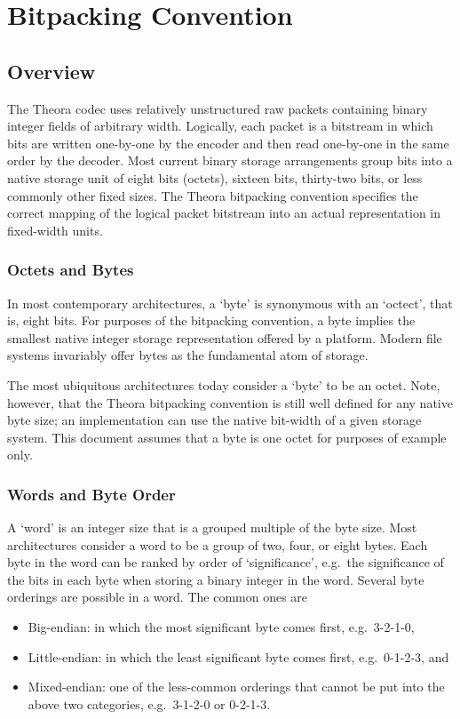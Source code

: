 \documentclass[11pt,letterpaper]{book}
\numberwithin{equation}{chapter}
\numberwithin{figure}{chapter}
\numberwithin{table}{chapter}
\begin{document}

\chapter{Bitpacking Convention}
\label{sec:bitpacking}

\section{Overview}

The Theora codec uses relatively unstructured raw packets containing
 binary integer fields of arbitrary width.
Logically, each packet is a bitstream in which bits are written one-by-one by
 the encoder and then read one-by-one in the same order by the decoder.
Most current binary storage arrangements group bits into a native storage unit
 of eight bits (octets), sixteen bits, thirty-two bits, or less commonly other
 fixed sizes.
The Theora bitpacking convention specifies the correct mapping of the logical
 packet bitstream into an actual representation in fixed-width units.

\subsection{Octets and Bytes}

In most contemporary architectures, a `byte' is synonymous with an `octect',
 that is, eight bits.
For purposes of the bitpacking convention, a byte implies the smallest native
 integer storage representation offered by a platform.
Modern file systems invariably offer bytes as the fundamental atom of storage.

The most ubiquitous architectures today consider a `byte' to be an octet.
Note, however, that the Theora bitpacking convention is still well defined for
 any native byte size; an implementation can use the native bit-width of a
 given storage system.
This document assumes that a byte is one octet for purposes of example only.

\subsection{Words and Byte Order}

A `word' is an integer size that is a grouped multiple of the byte size.
Most architectures consider a word to be a group of two, four, or eight bytes.
Each byte in the word can be ranked by order of `significance', e.g.\ the
 significance of the bits in each byte when storing a binary integer in the
 word.
Several byte orderings are possible in a word.
The common ones are
\begin{itemize}
\item{Big-endian:}
in which the most significant byte comes first, e.g.\ 3-2-1-0,
\item{Little-endian:}
in which the least significant byte comes first, e.g.\ 0-1-2-3, and
\item{Mixed-endian:}
one of the less-common orderings that cannot be put into the above two
 categories, e.g.\ 3-1-2-0 or 0-2-1-3.
\end{itemize}
\end{document}
